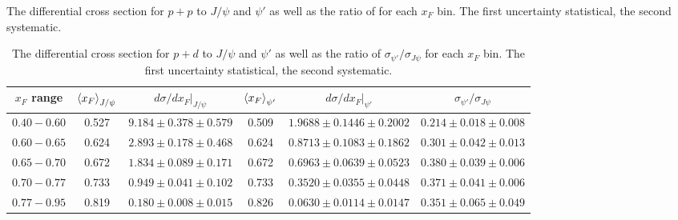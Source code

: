 \documentclass[reprint,aps,unsortedaddress,superscriptaddress,prd,floatfix,showpacs,linenumbers]{revtex4-2}
\begin{document}
\begin{table}[ht]
	\caption{The differential cross section for $p+p$ to $J/\psi$ and $\psi'$  as well as the ratio of
		for each $x_F$ bin. The first uncertainty  statistical, the second systematic. }
	\label{tab:pp_cs_xF}
	
\end{table}

\begin{table}[ht]
	\caption{The differential cross section for $p+d$ to $J/\psi$ and $\psi'$  as well as the ratio of
		$\sigma_{\psi'}/\sigma_{J\psi}$ for each $x_F$ bin. The first uncertainty  statistical, the second systematic. }
	\label{tab:pd_cs_xF}
	\begin{tabular}{c|ccccc}
		\hline
		$x_F$ range & $\expval{x_F}_{J/\psi}$ & $\left.d\sigma/dx_F\right|_{J/\psi}$ & $\expval{x_F}_{\psi'}$ & $\left.d\sigma/dx_F\right|_{\psi'}$ & $\sigma_{\psi'}/\sigma_{J\psi}$ \\ \hline
		$0.40-0.60$ & 0.527                   & $9.184\pm0.378\pm0.579$              & 0.509                  & $1.9688\pm0.1446\pm0.2002$           & $0.214\pm0.018\pm0.008$         \\
		$0.60-0.65$ & 0.624                   & $2.893\pm0.178\pm0.468$              & 0.624                  & $0.8713\pm0.1083\pm0.1862$           & $0.301\pm0.042\pm0.013$         \\
		$0.65-0.70$ & 0.672                   & $1.834\pm0.089\pm0.171$              & 0.672                  & $0.6963\pm0.0639\pm0.0523$           & $0.380\pm0.039\pm0.006$         \\
		$0.70-0.77$ & 0.733                   & $0.949\pm0.041\pm0.102$              & 0.733                  & $0.3520\pm0.0355\pm0.0448$           & $0.371\pm0.041\pm0.006$         \\
		$0.77-0.95$ & 0.819                   & $0.180\pm0.008\pm0.015$              & 0.826                  & $0.0630\pm0.0114\pm0.0147$           & $0.351\pm0.065\pm0.049$         \\ \hline
	\end{tabular}
\end{table}
\end{document}
